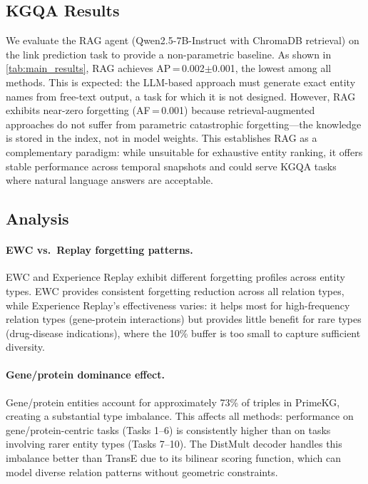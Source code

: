 \subsection{KGQA Results}
\label{sec:kgqa_results}

We evaluate the RAG agent (Qwen2.5-7B-Instruct with ChromaDB retrieval) on the link prediction task to provide a non-parametric baseline.
As shown in \cref{tab:main_results}, RAG achieves AP\,=\,0.002$\pm$0.001, the lowest among all methods.
This is expected: the LLM-based approach must generate exact entity names from free-text output, a task for which it is not designed.
However, RAG exhibits near-zero forgetting (AF\,=\,0.001) because retrieval-augmented approaches do not suffer from parametric catastrophic forgetting---the knowledge is stored in the index, not in model weights.
This establishes RAG as a complementary paradigm: while unsuitable for exhaustive entity ranking, it offers stable performance across temporal snapshots and could serve KGQA tasks where natural language answers are acceptable.

\subsection{Analysis}
\label{sec:analysis}

\paragraph{EWC vs.\ Replay forgetting patterns.}
EWC and Experience Replay exhibit different forgetting profiles across entity types.
EWC provides consistent forgetting reduction across all relation types, while Experience Replay's effectiveness varies: it helps most for high-frequency relation types (gene-protein interactions) but provides little benefit for rare types (drug-disease indications), where the 10\% buffer is too small to capture sufficient diversity.

\paragraph{Gene/protein dominance effect.}
Gene/protein entities account for approximately 73\% of triples in PrimeKG, creating a substantial type imbalance.
This affects all methods: performance on gene/protein-centric tasks (Tasks 1--6) is consistently higher than on tasks involving rarer entity types (Tasks 7--10).
The DistMult decoder handles this imbalance better than TransE due to its bilinear scoring function, which can model diverse relation patterns without geometric constraints.


